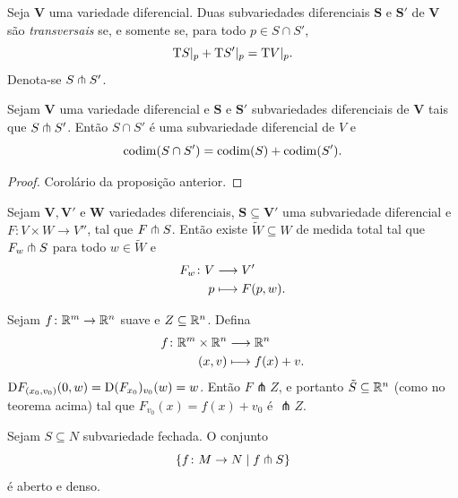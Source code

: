 \begin{definition}
Seja $\bm V$ uma variedade diferencial. Duas subvariedades diferenciais $\bm S$ e $\bm S'$ de $\bm V$ são \emph{transversais} se, e somente se, para todo $p \in S \cap S'$,
	\begin{equation*}
	\mathrm{T} S|_p + \mathrm{T} S'|_{p} = \mathrm{T} V|_{p}.
	\end{equation*}
Denota-se $S \pitchfork S'$.
\end{definition}

\begin{proposition}
Sejam $\bm V$ uma variedade diferencial e $\bm S$ e $\bm S'$ subvariedades diferenciais de $\bm V$ tais que $S \pitchfork S'$. Então $S \cap S'$ é uma subvariedade diferencial de $V$ e
	\begin{equation*}
	\operatorname{codim}(S \cap S') = \operatorname{codim}(S) + \operatorname{codim}(S').
	\end{equation*}
\end{proposition}
\begin{proof}
Corolário da proposição anterior.
\end{proof}


\begin{proposition}
Sejam $\bm V,\bm V'$ e $\bm W$ variedades diferenciais, $\bm S \subseteq \bm V'$ uma subvariedade diferencial e $F\colon V \times W \to V''$, tal que $F \pitchfork S$. Então existe $\tilde{W} \subseteq W$ de medida total tal que $F_w \pitchfork S$ para todo $w \in \tilde{W}$ e
	\begin{align*}
	{F_w}\colon {V} &\longrightarrow {V'} \\{p} &\longmapsto F(p,w).
	\end{align*}
\end{proposition}

\begin{example}Sejam $f\colon \mathbb{R}^m \to \mathbb{R}^n$ suave e $Z \subseteq \mathbb{R}^n$. Defina
	\begin{align*}
	{f}\colon {\mathbb{R}^m \times \mathbb{R}^n} &\longrightarrow {\mathbb{R}^n} \\{(x,v)} &\longmapsto f(x)+v.
	\end{align*}
$\mathrm{D} F_{(x_0,v_0)}(0,w)=\mathrm{D} (F_{x_0})_{v_0}(w) = w$. Então $F \pitchfork Z$, e portanto $\tilde{S}\subseteq \mathbb{R}^n$ (como no teorema acima) tal que $F_{v_0}(x)=f(x)+v_0$ é $\pitchfork Z$.
\end{example}

\begin{proposition}
Sejam $S \subseteq N$ subvariedade fechada. O conjunto
	\begin{equation*}
	\left\{ f\colon M \to N \;\middle\vert\; f \pitchfork S \right\}
	\end{equation*}
é aberto e denso.
\end{proposition}











